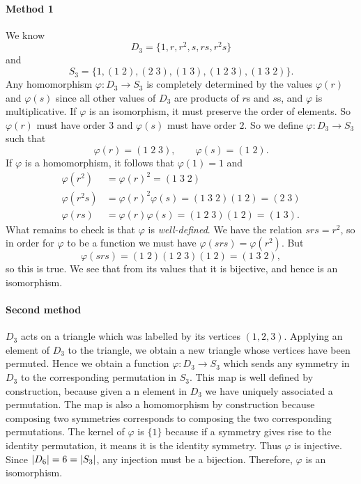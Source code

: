 \paragraph{Method 1}
We know
\[
    D_3 = \{1,r,r^2,s,rs,r^2s\}
\]
and
\[
    S_3 = \{1, (1\;2), (2\;3), (1\;3), (1\;2\;3), (1\;3\;2)\}.
\]
Any homomorphism $\varphi: D_3 \to S_3$ is completely determined by the values
$\varphi(r)$ and $\varphi(s)$ since all other values of $D_3$ are
products of $r$s and $s$s, and $\varphi$ is multiplicative.
If $\varphi$ is an isomorphism, it must preserve the order of elements.
So $\varphi(r)$ must have order $3$ and $\varphi(s)$ must have order $2$.
So we define $\varphi: D_3 \to S_3$ such that
\[
    \varphi(r) = (1\;2\;3), \qquad \varphi(s) = (1\;2).
\]
If $\varphi$ is a homomorphism, it follows that $\varphi(1) = 1$ and
\begin{align*}
    \varphi(r^2)  &= \varphi(r)^2 = (1\;3\;2) \\
    \varphi(r^2s) &= \varphi(r)^2\varphi(s) = (1\;3\;2)(1\;2) = (2\;3) \\
    \varphi(rs)   &= \varphi(r)\varphi(s) = (1\;2\;3)(1\;2) = (1\;3).
\end{align*}
What remains to check is that $\varphi$ is \emph{well-defined}.
We have the relation $srs = r^2$, so in order for $\varphi$ to be a function
we must have $\varphi(srs) = \varphi(r^2)$.
But
\[
    \varphi(srs) = (1\;2)(1\;2\;3)(1\;2) = (1\;3\;2),
\]
so this is true.
We see that from its values that it is bijective, and hence is an isomorphism.

\paragraph{Second method}

$D_3$ acts on a triangle which was labelled by its vertices $(1,2,3)$.
Applying an element of $D_3$ to the triangle, we obtain a new triangle
whose vertices have been permuted. Hence we obtain a function
$\varphi: D_3 \to S_3$ which sends any symmetry in $D_3$ to the corresponding
permutation in $S_3$.
This map is well defined by construction, because given a n element in $D_3$ we
have uniquely associated a permutation.
The map is also a homomorphism by construction because composing two symmetries
corresponds to composing the two corresponding permutations.
The kernel of $\varphi$ is $\{1\}$ because if a symmetry gives rise
to the identity permutation, it means it is the identity symmetry.
Thus $\varphi$ is injective.
Since $\left\lvert D_6\right\rvert = 6 = \left\lvert S_3\right\rvert$, any injection must be a bijection.
Therefore, $\varphi$ is an isomorphism.
